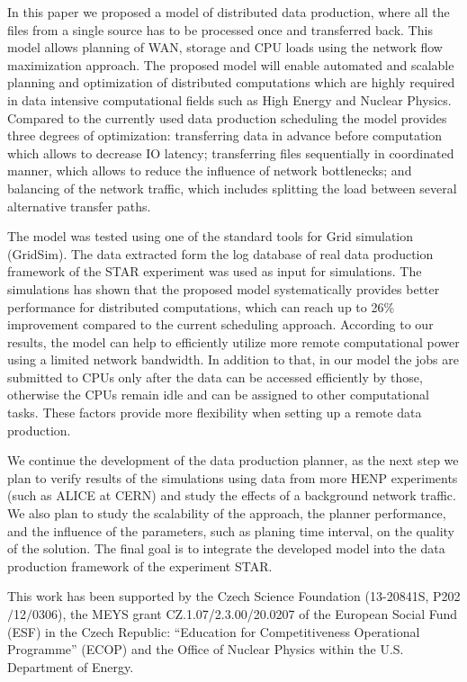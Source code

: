 \documentclass{svjour3}                     %
\begin{document}
In this paper we proposed a model of distributed data production, where all
the files from a single source has to be processed once and transferred back.
This model allows planning of WAN, storage and CPU loads using the network
flow maximization approach. The proposed model will enable automated and scalable planning and optimization of distributed computations which are highly required in data intensive computational fields such as High Energy and Nuclear Physics. Compared to the currently used data production scheduling the model provides three degrees of optimization: transferring data in advance before computation which allows to decrease IO latency; transferring  files sequentially in coordinated manner, which allows to reduce the influence of network bottlenecks; and balancing of the network traffic, which includes splitting the load between several alternative transfer paths.

The model was tested using one of the standard tools for Grid simulation (GridSim). The data extracted form the log database of real data production framework of the STAR experiment was used as input for simulations. The simulations has shown that the proposed model systematically provides better performance for distributed computations, which can reach up to 26\% improvement compared to the current scheduling approach. According to our results, the model can help to efficiently utilize more remote computational power using a limited network bandwidth. In addition to that, in our model the jobs are submitted to CPUs only after the data can be accessed efficiently by those, otherwise the CPUs remain idle and can be assigned to other computational tasks. These factors provide more flexibility when setting up a remote data production.

We continue the development of the data production planner, as the next step we plan to verify results of the simulations using data from more HENP experiments (such as ALICE at CERN) and study the effects of a background network traffic. We also plan to study the scalability of the approach, the planner performance, and the influence of the parameters, such as planing time interval, on the quality of the solution. The final goal is to integrate the developed model into the data production framework of the experiment STAR.


\begin{acknowledgements}
This work has been supported by the Czech Science Foundation
(13-20841S, P202$/$12$/$0306),  the MEYS grant CZ.1.07/2.3.00/20.0207 of the European Social Fund (ESF) in the Czech Republic: “Education for Competitiveness Operational Programme” (ECOP) and the Office of Nuclear Physics within the U.S. Department of Energy.  
\end{acknowledgements}

{}

\end{document}
